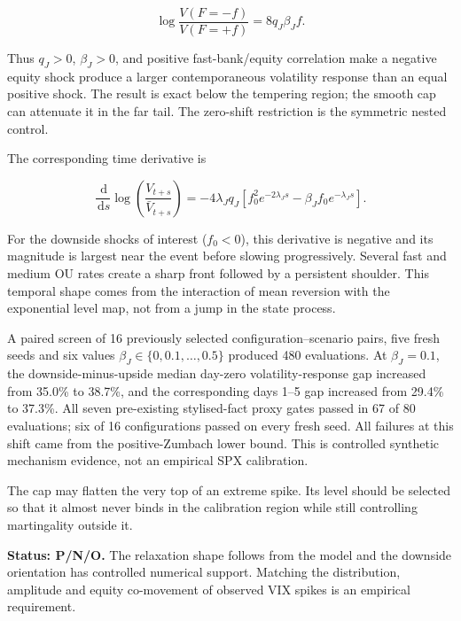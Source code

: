 \documentclass[11pt,a4paper]{article}
\newcommand{\dd}{\,\mathrm{d}}
\begin{document}
\begin{equation}
\log\!\frac{V(F=-f)}{V(F=+f)}=8q_J\beta_Jf.
\label{eq:spike-asymmetry}
\end{equation}

Thus \(q_J>0\), \(\beta_J>0\), and positive fast-bank/equity correlation make a negative
equity shock produce a larger contemporaneous volatility response than an equal positive
shock. The result is exact below the tempering region; the smooth cap can attenuate it in the
far tail. The zero-shift restriction is the symmetric nested control.

The corresponding time derivative is

\begin{equation}
\frac{\dd}{\dd s}\log\!\left(\frac{V_{t+s}}{\bar V_{t+s}}\right)
=-4\lambda_Jq_J\left[
f_0^2e^{-2\lambda_Js}-\beta_Jf_0e^{-\lambda_Js}
\right].
\label{eq:spike-decay}
\end{equation}

For the downside shocks of interest (\(f_0<0\)), this derivative is negative and its magnitude
is largest near the event before slowing progressively. Several fast and medium OU rates create
a sharp front followed by a persistent shoulder. This temporal shape comes from the interaction
of mean reversion with the exponential level map, not from a jump in the state process.

\begin{resultbox}
A paired screen of 16 previously selected configuration--scenario pairs, five fresh seeds and
six values \(\beta_J\in\{0,0.1,\ldots,0.5\}\) produced 480 evaluations. At \(\beta_J=0.1\),
the downside-minus-upside median day-zero volatility-response gap increased from 35.0\% to
38.7\%, and the corresponding days 1--5 gap increased from 29.4\% to 37.3\%. All seven
pre-existing stylised-fact proxy gates passed in 67 of 80 evaluations; six of 16 configurations
passed on every fresh seed. All failures at this shift came from the positive-Zumbach lower
bound. This is controlled synthetic mechanism evidence, not an empirical SPX calibration.
\end{resultbox}

The cap may flatten the very top of an extreme spike. Its level should be selected so that it
almost never binds in the calibration region while still controlling martingality outside it.

\textbf{Status: P/N/O.} The relaxation shape follows from the model and the downside orientation
has controlled numerical support. Matching the distribution,
amplitude and equity co-movement of observed VIX spikes is an empirical requirement.
\end{document}
